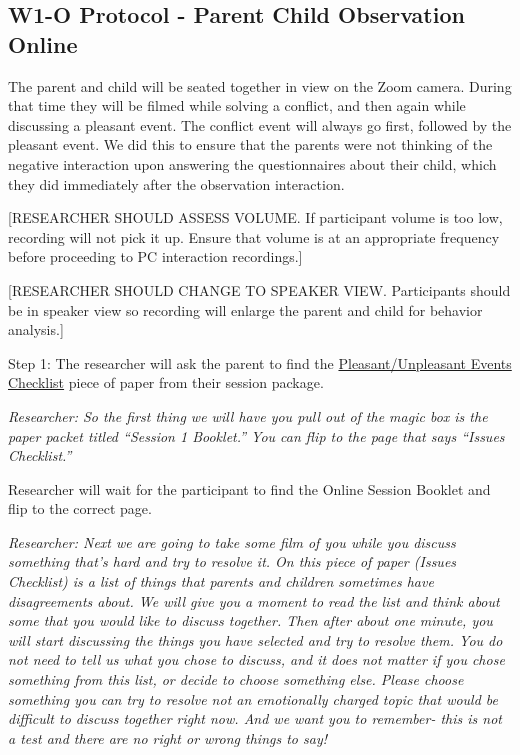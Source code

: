 \documentclass[
]{book}
\begin{document}
\hypertarget{w1-o-protocol---parent-child-observation-online}{%
\subsection{W1-O Protocol - Parent Child Observation Online}\label{w1-o-protocol---parent-child-observation-online}}

The parent and child will be seated together in view on the Zoom camera. During that time they will be filmed while solving a conflict, and then again while discussing a pleasant event. The conflict event will always go first, followed by the pleasant event. We did this to ensure that the parents were not thinking of the negative interaction upon answering the questionnaires about their child, which they did immediately after the observation interaction.

{[}RESEARCHER SHOULD ASSESS VOLUME. If participant volume is too low, recording will not pick it up. Ensure that volume is at an appropriate frequency before proceeding to PC interaction recordings.{]}

{[}RESEARCHER SHOULD CHANGE TO SPEAKER VIEW. Participants should be in speaker view so recording will enlarge the parent and child for behavior analysis.{]}

Step 1:
The researcher will ask the parent to find the \href{https://ucla.app.box.com/file/630327764749}{Pleasant/Unpleasant Events Checklist} piece of paper from their session package.

\emph{Researcher: So the first thing we will have you pull out of the magic box is the paper packet titled ``Session 1 Booklet.'' You can flip to the page that says ``Issues Checklist.''}

Researcher will wait for the participant to find the Online Session Booklet and flip to the correct page.

\emph{Researcher: Next we are going to take some film of you while you discuss something that's hard and try to resolve it. On this piece of paper (Issues Checklist) is a list of things that parents and children sometimes have disagreements about. We will give you a moment to read the list and think about some that you would like to discuss together. Then after about one minute, you will start discussing the things you have selected and try to resolve them. You do not need to tell us what you chose to discuss, and it does not matter if you chose something from this list, or decide to choose something else. Please choose something you can try to resolve not an emotionally charged topic that would be difficult to discuss together right now. And we want you to remember- this is not a test and there are no right or wrong things to say!}
\end{document}
